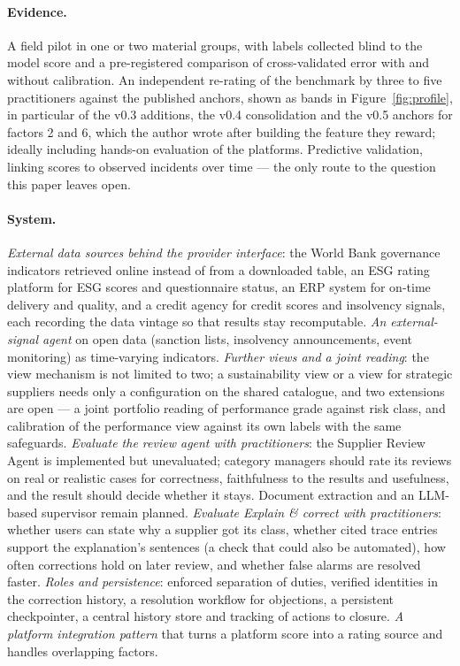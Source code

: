 \documentclass[10pt,twocolumn,a4paper]{article}
\begin{document}
\paragraph{Evidence.} A field pilot in one or two material groups, with labels collected
blind to the model score and a pre-registered comparison of cross-validated error with
and without calibration. An independent re-rating of the benchmark by three to five
practitioners against the published anchors, shown as bands in Figure~\ref{fig:profile}, in
particular of the v0.3 additions, the v0.4 consolidation and the v0.5 anchors for factors 2
and 6, which the author wrote after building the feature they reward; ideally including hands-on evaluation of the platforms. Predictive validation, linking
scores to observed incidents over time --- the only route to the question this paper
leaves open.

\paragraph{System.} \emph{External data sources behind the provider interface}: the
World Bank governance indicators retrieved online instead of from a downloaded table, an
ESG rating platform for ESG scores and questionnaire status, an ERP system for on-time
delivery and quality, and a credit agency for credit scores and insolvency signals, each
recording the data vintage so that results stay recomputable. \emph{An external-signal
agent} on open data (sanction lists, insolvency announcements, event monitoring) as
time-varying indicators. \emph{Further views and a joint reading}: the view mechanism is
not limited to two; a sustainability view or a view for strategic suppliers needs only a
configuration on the shared catalogue, and two extensions are open --- a joint portfolio
reading of performance grade against risk class, and calibration of the performance view
against its own labels with the same safeguards. \emph{Evaluate the review agent with
practitioners}: the Supplier Review Agent is implemented but unevaluated; category
managers should rate its reviews on real or realistic cases for correctness,
faithfulness to the results and usefulness, and the result should decide whether it
stays. Document extraction and an LLM-based supervisor remain planned. \emph{Evaluate
Explain \& correct with practitioners}: whether users can state why a supplier got its class,
whether cited trace entries support the explanation's sentences (a check that could also be
automated), how often corrections hold on later review, and whether false alarms are resolved
faster. \emph{Roles and persistence}: enforced separation of
duties, verified identities in the correction history, a resolution workflow for objections, a persistent checkpointer, a central history store and tracking of actions to
closure. \emph{A platform integration pattern} that turns a platform score into a rating
source and handles overlapping factors.
\end{document}
